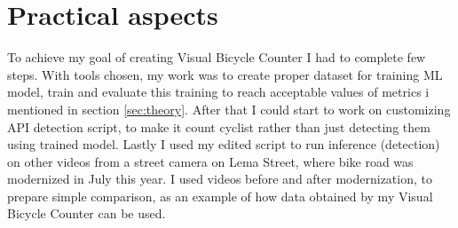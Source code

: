 \chapter{Practical aspects}
\label{cha:practicalAspects}

To achieve my goal of creating Visual Bicycle Counter I had to complete few steps. With tools chosen, my work was to create proper dataset for training ML model, train and evaluate this training to reach acceptable values of metrics i mentioned in section \ref{sec:theory}. After that I could start to work on customizing API detection script, to make it count cyclist rather than just detecting them using trained model. Lastly I used my edited script to run inference (detection) on other videos from a street camera on Lema Street, where bike road was modernized in July this year. I used videos before and after modernization, to prepare simple comparison, as an example of how data obtained by my Visual Bicycle Counter can be used.

